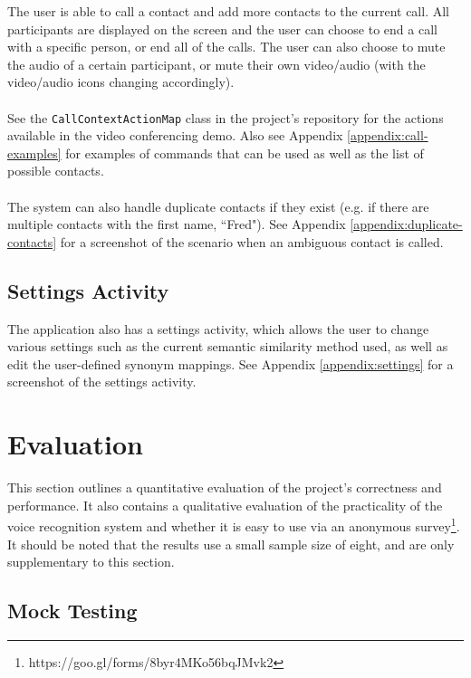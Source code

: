 \documentclass[11pt]{article}
\begin{document}
The user is able to call a contact and add more contacts to the current call. All participants are displayed on the screen and the user can choose to end a call with a specific person, or end all of the calls. The user can also choose to mute the audio of a certain participant, or mute their own video/audio (with the video/audio icons changing accordingly).
\\
\\
See the \texttt{CallContextActionMap} class in the project's repository for the actions available in the video conferencing demo. Also see Appendix \ref{appendix:call-examples} for examples of commands that can be used as well as the list of possible contacts.
\\
\\
The system can also handle duplicate contacts if they exist (e.g. if there are multiple contacts with the first name, ``Fred"). See Appendix \ref{appendix:duplicate-contacts} for a screenshot of the scenario when an ambiguous contact is called.

\subsection{Settings Activity}
\label{section:settings}

The application also has a settings activity, which allows the user to change various settings such as the current semantic similarity method used, as well as edit the user-defined synonym mappings. See Appendix \ref{appendix:settings} for a screenshot of the settings activity.

\newpage
\section{Evaluation}
\label{evaluation}

This section outlines a quantitative evaluation of the project's correctness and performance. It also contains a qualitative evaluation of the practicality of the voice recognition system and whether it is easy to use via an anonymous survey\footnote{https://goo.gl/forms/8byr4MKo56bqJMvk2}. It should be noted that the results use a small sample size of eight, and are only supplementary to this section.

\subsection{Mock Testing}
\label{section:mock-testing}
\end{document}
